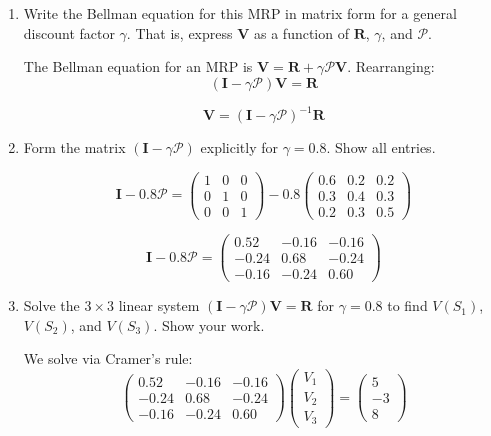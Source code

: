 \documentclass[12pt]{article}
\begin{document}
\begin{enumerate}[label=(\alph*)]
\item Write the Bellman equation for this MRP in matrix form for a general discount factor $\gamma$. That is, express $\mathbf{V}$ as a function of $\mathbf{R}$, $\gamma$, and $\mathcal{P}$.

\begin{stepbox}[Solution 1(a)]
The Bellman equation for an MRP is $\mathbf{V} = \mathbf{R} + \gamma \mathcal{P}\mathbf{V}$. Rearranging:
\[
(\mathbf{I} - \gamma \mathcal{P})\mathbf{V} = \mathbf{R}
\]
\end{stepbox}
\begin{resultsbox}
\[
\boxed{\mathbf{V} = (\mathbf{I} - \gamma \mathcal{P})^{-1}\mathbf{R}}
\]
\end{resultsbox}

\item Form the matrix $(\mathbf{I} - \gamma \mathcal{P})$ explicitly for $\gamma = 0.8$. Show all entries.

\begin{stepbox}[Solution 1(b)]
\[
\mathbf{I} - 0.8\mathcal{P} = \begin{pmatrix} 1 & 0 & 0 \\ 0 & 1 & 0 \\ 0 & 0 & 1 \end{pmatrix} - 0.8\begin{pmatrix} 0.6 & 0.2 & 0.2 \\ 0.3 & 0.4 & 0.3 \\ 0.2 & 0.3 & 0.5 \end{pmatrix}
\]
\end{stepbox}
\begin{resultsbox}
\[
\boxed{\mathbf{I} - 0.8\mathcal{P} = \begin{pmatrix} 0.52 & -0.16 & -0.16 \\ -0.24 & 0.68 & -0.24 \\ -0.16 & -0.24 & 0.60 \end{pmatrix}}
\]
\end{resultsbox}

\item Solve the $3 \times 3$ linear system $(\mathbf{I} - \gamma \mathcal{P})\mathbf{V} = \mathbf{R}$ for $\gamma = 0.8$ to find $V(S_1)$, $V(S_2)$, and $V(S_3)$. Show your work.

\begin{stepbox}
We solve via Cramer's rule:
\[
\begin{pmatrix} 0.52 & -0.16 & -0.16 \\ -0.24 & 0.68 & -0.24 \\ -0.16 & -0.24 & 0.60 \end{pmatrix} \begin{pmatrix} V_1 \\ V_2 \\ V_3 \end{pmatrix} = \begin{pmatrix} 5 \\ -3 \\ 8 \end{pmatrix}
\]
\end{stepbox}


\end{enumerate}
\end{document}
